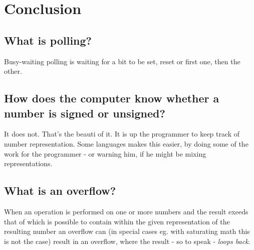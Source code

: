 \section{Conclusion}

\subsection{What is polling?}
Busy-waiting polling is waiting for a bit to be set, reset or first one, then
the other.

\subsection{How does the computer know whether a number is signed or unsigned?}
It does not. That's the beauti of it. It is up the programmer to keep track of
number representation. Some languages makes this easier, by doing some of the
work for the programmer - or warning him, if he might be mixing representations.

\subsection{What is an overflow?}
When an operation is performed on one or more numbers and the result exeeds that
of which is possible to contain within the given representation of the resulting
number an overflow can (in special cases eg. with saturating math this is not
the case) result in an overflow, where the result - so to speak - \emph{loops
back}.
